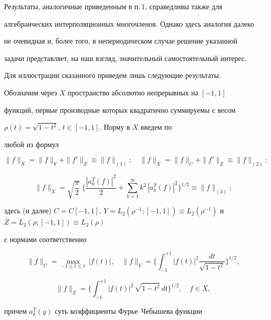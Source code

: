 Результаты, аналогичные приведенным в п.\,1, справедливы также для


алгебраических интерполяционных многочленов. Однако здесь аналогия далеко


не очевидная и, более того, в непериодическом случае решение указанной


задачи представляет, на наш взгляд, значительный самостоятельный интерес.


Для иллюстрации сказанного приведем лишь следующие результаты.





Обозначим через $X $ пространство абсолютно непрерывных на $ [-1,1]$


функций, первые производные которых квадратично суммируемы с весом


$\rho(t)=\sqrt{1-t^2}$, $t\in [-1,1]$. Норму в $X$ введем по


любой из формул


$$


\|f\|_X=\|f\|_Y +\|f'\|_Z\equiv \|f\|_{(1)};


\quad \|f\|_X=\|f\|_C +\|f'\|_Z\equiv \|f\|_{(2)};


$$


$$


\|f\|_X=\sqrt{\frac{\pi}{2}}\;


\biggl\{ \frac{|a_0^T(f)|^2}{2}+\sum_{k=1}^\infty


k^2\, |a_k^T(f)|^2 \biggr\}^{1/2}\equiv \|f\|_{(3)};


$$


здесь (и далее) $C=C[-1,1]$, $Y=L_2(\rho^{-1};[-1,1])


\equiv L_2(\rho^{-1})$ и $Z=L_2(\rho ;[-1,1])\equiv L_2(\rho )$


с нормами соответственно


$$


\|f\|_C=\max_{-1\le t\le 1}\, |f(t)|,\quad


\|f\|_Y=\biggl\{ \int_{-1}^{+1}|f(t)|^2\frac{dt}{\sqrt{1-t^2}}


\biggr\}^{1/2},


$$


$$


\|f\|_Z=\biggl\{ \int_{-1}^{+1}|f(t)|^2\, \sqrt{1-t^2}\, dt


\biggr\}^{1/2}, \quad f\in X ,


$$


причем $a_k^T(y)$ суть коэффициенты Фурье--Чебышева функции


